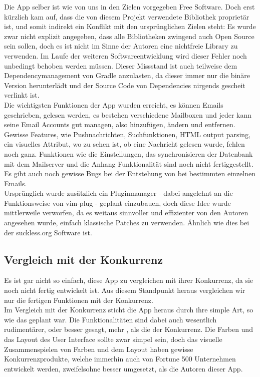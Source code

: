 \documentclass[a4paper,11pt]{article}
\begin{document}
Die App selber ist wie von uns in den Zielen vorgegeben Free Software. Doch erst kürzlich kam auf, dass die von diesem Projekt verwendete  Bibliothek proprietär ist, und somit indirekt ein Konflikt mit den ursprünglichen Zielen steht: Es wurde zwar nicht explizit angegeben, dass alle Bibliotheken zwingend auch Open Source sein sollen, doch es ist nicht im Sinne der Autoren eine nichtfreie Library zu verwenden. Im Laufe der weiteren Softwareentwicklung wird dieser Fehler noch unbedingt behoben werden müssen. Dieser Missstand ist auch teilweise dem Dependencymanagement von Gradle anzulasten, da dieser immer nur die binäre Version herunterlädt und der Source Code von Dependencies nirgends gescheit verlinkt ist.\\

Die wichtigsten Funktionen der App wurden erreicht, es können Emails geschrieben, gelesen werden, es bestehen verschiedene Mailboxen und jeder kann seine Email Accounts gut managen, also hinzufügen, ändern und entfernen. Gewisse Features, wie Pushnachrichten, Suchfunktionen, HTML output parsing, ein visuelles Attribut, wo zu sehen ist, ob eine Nachricht gelesen wurde, fehlen noch ganz. Funktionen wie die Einstellungen, das synchronisieren der Datenbank mit dem Mailserver und die Anhang Funktionalität sind noch nicht fertiggestellt. Es gibt auch noch gewisse Bugs bei der Entstehung von  \cite{edgecase} bei bestimmten einzelnen Emails.\\

Ursprünglich wurde zusätzlich ein Pluginmanager - dabei angelehnt an die Funktionsweise von vim-plug \cite{plug} - geplant einzubauen, doch diese Idee wurde mittlerweile verworfen, da es weitaus sinnvoller und effizienter von den Autoren angesehen wurde, einfach klassische Patches zu verwenden. Ähnlich wie dies bei der suckless.org Software ist. \cite{dwm}

\subsection{Vergleich mit der Konkurrenz}
Es ist gar nicht so einfach, diese App zu vergleichen mit ihrer Konkurrenz, da sie noch nicht fertig entwickelt ist. Aus diesem Standpunkt heraus vergleichen wir nur die fertigen Funktionen mit der Konkurrenz.\\

Im Vergleich mit der Konkurrenz sticht die App heraus durch ihre simple Art, so wie das geplant war. Die Funktionalitäten sind dabei auch wesentlich rudimentärer, oder besser gesagt, mehr , als die der Konkurrenz. Die Farben und das Layout des User Interface sollte zwar simpel sein, doch das visuelle Zusammenspielen von Farben und dem Layout haben gewisse Konkurrenzprodukte, welche immerhin auch von Fortune 500 Unternehmen entwickelt werden, zweifelsohne besser umgesetzt, als die Autoren dieser App.
\end{document}
